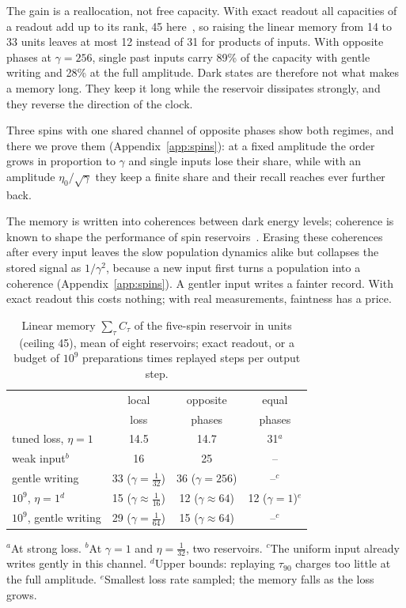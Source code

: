 The gain is a reallocation, not free capacity. With exact readout all capacities of a readout add up to its rank, 45
here~\cite{Dambre2012}, so raising the linear memory from 14 to 33 units leaves at most 12 instead of 31 for products
of inputs. With opposite phases at $\gamma=256$, single past inputs carry 89\% of the capacity with gentle writing and
28\% at the full amplitude. Dark states are therefore not what makes a memory long. They keep it long while the
reservoir dissipates strongly, and they reverse the direction of the clock.

Three spins with one shared channel of opposite phases show both regimes, and there we prove them
(Appendix~\ref{app:spins}): at a fixed amplitude the order grows in proportion to $\gamma$ and single inputs lose
their share, while with an amplitude $\eta_0/\sqrt\gamma$ they keep a finite share and their recall reaches ever
further back.

The memory is written into coherences between dark energy levels; coherence is known to shape the performance of
spin reservoirs~\cite{Palacios2024}. Erasing these coherences after every input leaves the slow population dynamics
alike but collapses the stored signal as $1/\gamma^2$, because a new input first turns a population into a coherence
(Appendix~\ref{app:spins}). A gentler input writes a fainter record. With exact readout this costs nothing; with real
measurements, faintness has a price.

\begin{table}[t]
\caption{\label{tab:memory}Linear memory $\sum_\tau C_\tau$ of the five-spin reservoir in units (ceiling 45), mean
of eight reservoirs; exact readout, or a budget of $10^9$ preparations times replayed steps per output step.}
\centering\footnotesize\setlength{\tabcolsep}{2pt}
\begin{tabular}{@{}lccc@{}}
\toprule
 & local & opposite & equal\\
 & loss & phases & phases\\\midrule
tuned loss, $\eta=1$ & 14.5 & 14.7 & 31$^{a}$\\
weak input$^{b}$ & 16 & 25 & --\\
gentle writing & 33 ($\gamma=\frac1{32}$) & 36 ($\gamma=256$) & --$^{c}$\\
$10^9$, $\eta=1$$^{d}$ & 15 ($\gamma\approx\frac1{16}$) & 12 ($\gamma\approx64$) & 12 ($\gamma=1$)$^{e}$\\
$10^9$, gentle writing & 29 ($\gamma=\frac1{64}$) & 15 ($\gamma\approx64$) & --$^{c}$\\
\bottomrule
\end{tabular}

\smallskip
\raggedright\footnotesize
$^{a}$At strong loss. $^{b}$At $\gamma=1$ and $\eta=\frac1{32}$, two reservoirs. $^{c}$The uniform input already
writes gently in this channel. $^{d}$Upper bounds: replaying $\tau_{90}$ charges too little at the full amplitude.
$^{e}$Smallest loss rate sampled; the memory falls as the loss grows.
\end{table}

